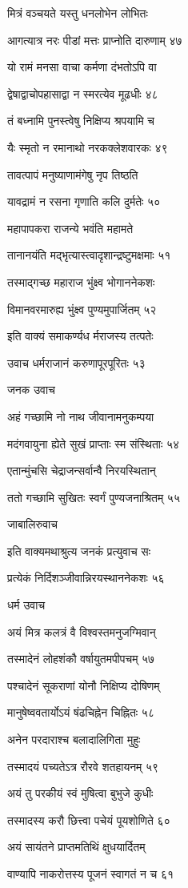 मित्रं वञ्चयते यस्तु धनलोभेन लोभितः

आगत्यात्र नरः पीडां मत्तः प्राप्नोति दारुणाम् ४७

यो रामं मनसा वाचा कर्मणा दंभतोऽपि वा

द्वेषाद्वाचोपहासाद्वा न स्मरत्येव मूढधीः ४८

तं बध्नामि पुनस्त्वेषु निक्षिप्य श्रपयामि च

यैः स्मृतो न रमानाथो नरकक्लेशवारकः ४९

तावत्पापं मनुष्याणामंगेषु नृप तिष्ठति

यावद्रामं न रसना गृणाति कलि दुर्मतेः ५०

महापापकरा राजन्ये भवंति महामते

तानानयंति मद्भृत्यास्त्वादृशान्द्रष्टुमक्षमाः ५१

तस्माद्गच्छ महाराज भुंक्ष्व भोगाननेकशः

विमानवरमारुह्य भुंक्ष्व पुण्यमुपार्जितम् ५२

इति वाक्यं समाकर्ण्यध र्मराजस्य तत्पतेः

उवाच धर्मराजानं करुणापूरपूरितः ५३

जनक उवाच

अहं गच्छामि नो नाथ जीवानामनुकम्पया

मदंगवायुना ह्येते सुखं प्राप्ताः स्म संस्थिताः ५४

एतान्मुंचसि चेद्राजन्सर्वान्वै निरयस्थितान्

ततो गच्छामि सुखितः स्वर्गं पुण्यजनाश्रितम् ५५

जाबालिरुवाच

इति वाक्यमथाश्रुत्य जनकं प्रत्युवाच सः

प्रत्येकं निर्दिशञ्जीवान्निरयस्थाननेकशः ५६

धर्म उवाच

अयं मित्र कलत्रं वै विश्वस्तमनुजग्मिवान्

तस्मादेनं लोहशंकौ वर्षायुतमपीपचम् ५७

पश्चादेनं सूकराणां योनौ निक्षिप्य दोषिणम्

मानुषेष्ववतार्योऽयं षंढचिह्नेन चिह्नितः ५८

अनेन परदाराश्च बलादालिगिता मुहुः

तस्मादयं पच्यतेऽत्र रौरवे शतहायनम् ५९

अयं तु परकीयं स्वं मुषित्वा बुभुजे कुधीः

तस्मादस्य करौ छित्त्वा पचेयं पूयशोणिते ६०

अयं सायंतने प्राप्तमतिथिं क्षुधयार्दितम्

वाण्यापि नाकरोत्तस्य पूजनं स्वागतं न च ६१

